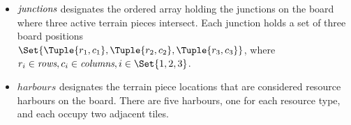 \documentclass[a4paper,11pt]{article}
\begin{document}
\begin{itemize}
\item $\textit{junctions}$ designates the ordered array holding the junctions on the board where three active terrain pieces intersect. Each junction holds a set of three board positions \\ $\Set{ \Tuple{r_1,c_1}, \Tuple{r_2,c_2}, \Tuple{r_3,c_3} }$, where $r_i \in \Rows, c_i \in \Cols, i \in \Set{1,2,3}$.

\item $harbours$ designates the terrain piece locations that are considered resource harbours on the board. There are five harbours, one for each resource type, and each occupy two adjacent tiles.

\end{itemize}

\newcommand{\Pieces}{\textit{pieces}}
\newcommand{\AllotmentNumbers}{\textit{allotmentNumbers}}
\newcommand{\AllotmentScores}{\textit{allotmentScores}}
\newcommand{\JunctionScores}{\textit{junctionScores}}
\newcommand{\PieceTypeScoreMean}{\textit{PieceTypeScoreMean}}
\end{document}
